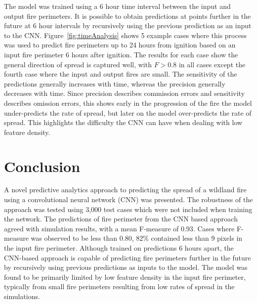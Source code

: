 \documentclass[twocolumn]{svjour3}          %
\begin{document}
The model was trained using a 6 hour time interval between the input
and output fire perimeters. It is possible to obtain predictions at points
further in the future at 6 hour intervals by recursively using the previous
prediction as an input to the CNN. Figure~\ref{fig:timeAnalysis} shows
5 example cases where this process was used to predict fire perimeters
up to 24 hours from ignition based on an input fire perimeter 6 hours after
ignition. The results for each case show the general direction of spread
is captured well, with $F > 0.8$ in all cases except the fourth case where
the input and output fires are small.
The sensitivity of the predictions generally increases
with time, whereas the precision generally decreases with time. Since
precision describes commission errors and sensitivity describes omission
errors, this shows early in the progression of the fire the model
under-predicts the rate of spread, but later on the model over-predicts
the rate of spread. This highlights the difficulty the CNN can have
when dealing with low feature density.






















\section{Conclusion}
\label{s:Conclusion}

A novel predictive analytics approach to predicting the spread of
a wildland fire using a convolutional neural network (CNN) was presented.
The robustness of the approach was tested using 3,000 test cases
which were not included when training the network. The predictions of
fire perimeter from the CNN based approach agreed with simulation results,
with a mean F-measure of 0.93. Cases where F-measure was observed to
be less than 0.80, 82\% contained less than 9 pixels in the input
fire perimeter. Although trained on predictions 6 hours apart, the
CNN-based approach is capable of predicting fire perimeters further
in the future by recursively using previous predictions as inputs to
the model. The model was found to be primarily limited by low feature
density in the input fire perimeter, typically from small fire
perimeters resulting from low rates of spread in the simulations.
\end{document}
